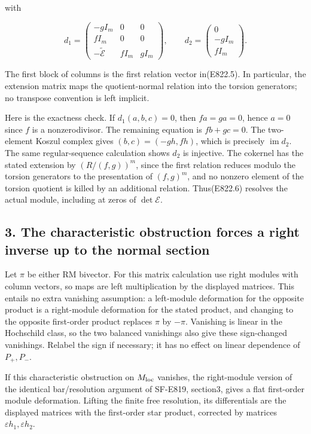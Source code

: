 with

\[
 d_1=\begin{pmatrix}
 -gI_m&0&0\\
 fI_m&0&0\\
 -\widetilde{\mathcal E}&fI_m&gI_m
 \end{pmatrix},
 \qquad
 d_2=\begin{pmatrix}0\\-gI_m\\fI_m\end{pmatrix}.
 \tag{E822.7}
\]

The first block of columns is the first relation vector in(E822.5). In
particular, the extension matrix maps the quotient-normal relation into
the torsion generators; no transpose convention is left implicit.

Here is the exactness check. If \(d_1(a,b,c)=0\), then \(fa=ga=0\),
hence \(a=0\) since \(f\) is a nonzerodivisor. The remaining equation is
\(fb+gc=0\). The two-element Koszul complex gives \((b,c)=(-gh,fh)\),
which is precisely \(\operatorname{im}d_2\). The same regular-sequence
calculation shows \(d_2\) is injective. The cokernel has the stated
extension by \((R/(f,g))^m\), since the first relation reduces modulo
the torsion generators to the presentation of \((f,g)^m\), and no
nonzero element of the torsion quotient is killed by an additional
relation. Thus(E822.6) resolves the actual module, including at zeros of
\(\det\mathcal E\).

\subsection{3. The characteristic obstruction forces a right inverse up
to the normal
section}\label{SF-E822-the-characteristic-obstruction-forces-a-right-inverse-up-to-the-normal-section}

Let \(\pi\) be either RM bivector. For this matrix calculation use right
modules with column vectors, so maps are left multiplication by the
displayed matrices. This entails no extra vanishing assumption: a
left-module deformation for the opposite product is a right-module
deformation for the stated product, and changing to the opposite
first-order product replaces \(\pi\) by \(-\pi\). Vanishing is linear in
the Hochschild class, so the two balanced vanishings also give these
sign-changed vanishings. Relabel the sign if necessary; it has no effect
on linear dependence of \(P_+,P_-\).

If this characteristic obstruction on \(M_{\rm loc}\) vanishes, the
right-module version of the identical bar/resolution argument of
SF-E819, section3, gives a flat first-order module deformation. Lifting
the finite free resolution, its differentials are the displayed matrices
with the first-order star product, corrected by matrices
\(\varepsilon h_1,\varepsilon h_2\).

